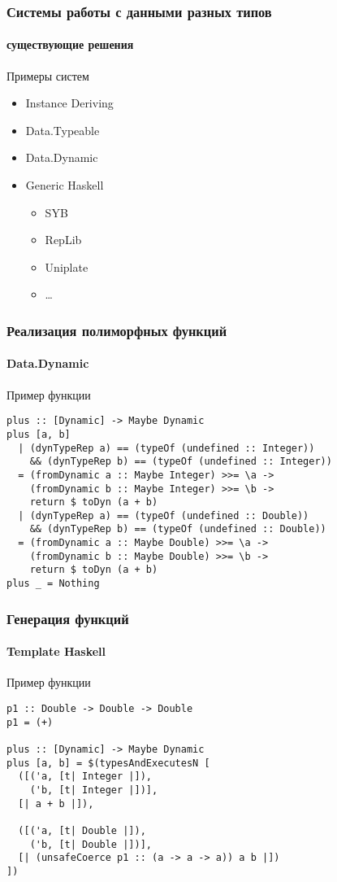 \documentclass[ucs]{beamer}
\begin{document}
\begin{frame}[fragile]
  \frametitle{Системы работы с данными разных типов}
  \framesubtitle{существующие решения}

  \begin{block}{Примеры систем}
    \begin{itemize}
    \item Instance Deriving
    \item Data.Typeable
    \item Data.Dynamic
    \item Generic Haskell
      \begin{itemize}
      \item SYB
      \item RepLib
      \item Uniplate
      \item \dots
      \end{itemize}
    \end{itemize}
  \end{block}
\end{frame}

\begin{frame}[fragile]
  \frametitle{Реализация полиморфных функций}
  \framesubtitle{Data.Dynamic}

  \begin{block}{Пример функции}
\begin{verbatim}
plus :: [Dynamic] -> Maybe Dynamic
plus [a, b]
  | (dynTypeRep a) == (typeOf (undefined :: Integer))
    && (dynTypeRep b) == (typeOf (undefined :: Integer))
  = (fromDynamic a :: Maybe Integer) >>= \a ->
    (fromDynamic b :: Maybe Integer) >>= \b ->
    return $ toDyn (a + b)
  | (dynTypeRep a) == (typeOf (undefined :: Double))
    && (dynTypeRep b) == (typeOf (undefined :: Double))
  = (fromDynamic a :: Maybe Double) >>= \a ->
    (fromDynamic b :: Maybe Double) >>= \b ->
    return $ toDyn (a + b)
plus _ = Nothing
\end{verbatim}
  \end{block}
\end{frame}

\begin{frame}[fragile]
  \frametitle{Генерация функций}
  \framesubtitle{Template Haskell}

  \begin{block}{Пример функции}
\begin{verbatim}
p1 :: Double -> Double -> Double
p1 = (+)

plus :: [Dynamic] -> Maybe Dynamic
plus [a, b] = $(typesAndExecutesN [
  ([('a, [t| Integer |]),
    ('b, [t| Integer |])],
  [| a + b |]),

  ([('a, [t| Double |]),
    ('b, [t| Double |])],
  [| (unsafeCoerce p1 :: (a -> a -> a)) a b |])
])
\end{verbatim}
  \end{block}
\end{frame}
\end{document}
